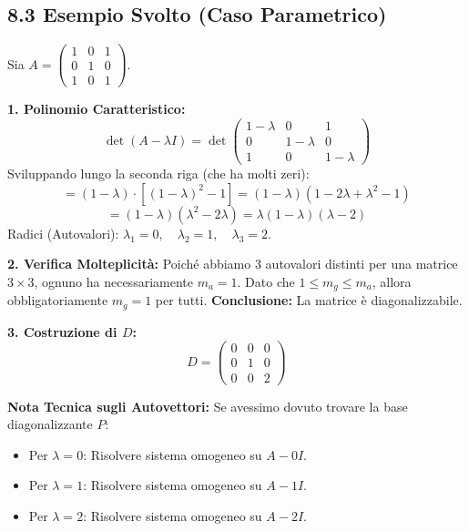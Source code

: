 \documentclass[10pt,a4paper]{article}
\begin{document}
\subsection*{8.3 Esempio Svolto (Caso Parametrico)}
Sia $A = \begin{pmatrix} 1 & 0 & 1 \\ 0 & 1 & 0 \\ 1 & 0 & 1 \end{pmatrix}$.

\textbf{1. Polinomio Caratteristico:}
\[ \det(A - \lambda I) = \det \begin{pmatrix} 1-\lambda & 0 & 1 \\ 0 & 1-\lambda & 0 \\ 1 & 0 & 1-\lambda \end{pmatrix} \]
Sviluppando lungo la seconda riga (che ha molti zeri):
\[ = (1-\lambda) \cdot [ (1-\lambda)^2 - 1 ] = (1-\lambda)(1 - 2\lambda + \lambda^2 - 1) \]
\[ = (1-\lambda)(\lambda^2 - 2\lambda) = \lambda(1-\lambda)(\lambda - 2) \]
Radici (Autovalori): $\lambda_1 = 0, \quad \lambda_2 = 1, \quad \lambda_3 = 2$.

\textbf{2. Verifica Molteplicità:}
Poiché abbiamo 3 autovalori distinti per una matrice $3 \times 3$, ognuno ha necessariamente $m_a = 1$.
Dato che $1 \le m_g \le m_a$, allora obbligatoriamente $m_g = 1$ per tutti.
\textbf{Conclusione:} La matrice è diagonalizzabile.

\textbf{3. Costruzione di $D$:}
\[ D = \begin{pmatrix} 0 & 0 & 0 \\ 0 & 1 & 0 \\ 0 & 0 & 2 \end{pmatrix} \]

\medskip

\textbf{Nota Tecnica sugli Autovettori:}
Se avessimo dovuto trovare la base diagonalizzante $P$:
\begin{itemize}
    \item Per $\lambda=0$: Risolvere sistema omogeneo su $A - 0I$.
    \item Per $\lambda=1$: Risolvere sistema omogeneo su $A - 1I$.
    \item Per $\lambda=2$: Risolvere sistema omogeneo su $A - 2I$.
\end{itemize}

\vspace{0.5cm}
\end{document}

